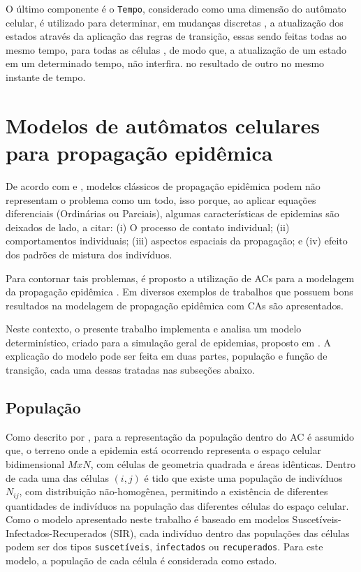 \documentclass[
	11pt,				%
	openright,			%
	oneside,			%
	a4paper,			%
	english,			%
	french,				%
	spanish,			%
	brazil,				%
	]{abntex2}
\begin{document}
\par O último componente é o \texttt{Tempo}, considerado como uma dimensão do autômato celular, é utilizado para determinar, em mudanças discretas \cite{alexanderschatten2008}, a atualização dos estados através da aplicação das regras de transição, essas sendo feitas todas ao mesmo tempo, para todas as células \cite{Liu2008}, de modo que, a atualização de um estado em um determinado tempo, não interfira. no resultado de outro no mesmo instante de tempo.

\chapter{Modelos de autômatos celulares para propagação epidêmica}

\par De acordo com  e , modelos clássicos de propagação epidêmica podem não representam o problema como um todo, isso porque, ao aplicar equações diferenciais (Ordinárias ou Parciais), algumas características de epidemias são deixados de lado, a citar: (i) O processo de contato individual; (ii) comportamentos individuais; (iii) aspectos espaciais da propagação; e (iv) efeito dos padrões de mistura dos indivíduos.

\par Para contornar tais problemas, é proposto a utilização de ACs para a modelagem da propagação epidêmica \cite{White2007, Sirakoulis2000}. Em  diversos exemplos de trabalhos que possuem bons resultados na modelagem de propagação epidêmica com CAs são apresentados.

\par Neste contexto, o presente trabalho implementa e analisa um modelo determinístico, criado para a simulação geral de epidemias, proposto em \cite{White2007}. A explicação do modelo pode ser feita em duas partes, população e função de transição, cada uma dessas tratadas nas subseções abaixo.

\section{População}

\par Como descrito por , para a representação da população dentro do AC é assumido que, o terreno onde a epidemia está ocorrendo representa o espaço celular bidimensional $MxN$, com células de geometria quadrada e áreas idênticas. Dentro de cada uma das células $(i, j)$ é tido que existe uma população de indivíduos $N_{ij}$, com distribuição não-homogênea, permitindo a existência de diferentes quantidades de indivíduos na população das diferentes células do espaço celular. Como o modelo apresentado neste trabalho é baseado em modelos Suscetíveis-Infectados-Recuperados (SIR), cada indivíduo dentro das populações das células podem ser dos tipos \texttt{suscetíveis}, \texttt{infectados} ou \texttt{recuperados}. Para este modelo, a população de cada célula é considerada como estado.
\end{document}

